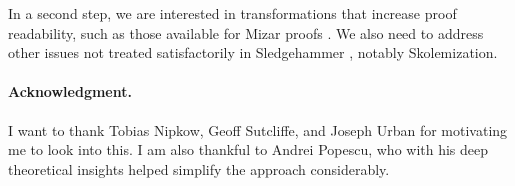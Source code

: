 \documentclass[withtimes,a4paper,12pt]{easychair}
\begin{document}
In a second step, we are interested in transformations that increase proof
readability, such as those available for Mizar proofs \cite{pak-2010}. We also
need to address other issues not treated satisfactorily in Sledgehammer
\cite{paulson-susanto-2007}, notably Skolemization.

\paragraph{Acknowledgment.}
I want to thank Tobias Nipkow, Geoff Sutcliffe, and Joseph Urban for motivating
me to look into this. I am also thankful to Andrei Popescu, who with his deep
theoretical insights helped simplify the approach considerably.

{}

\end{document}
